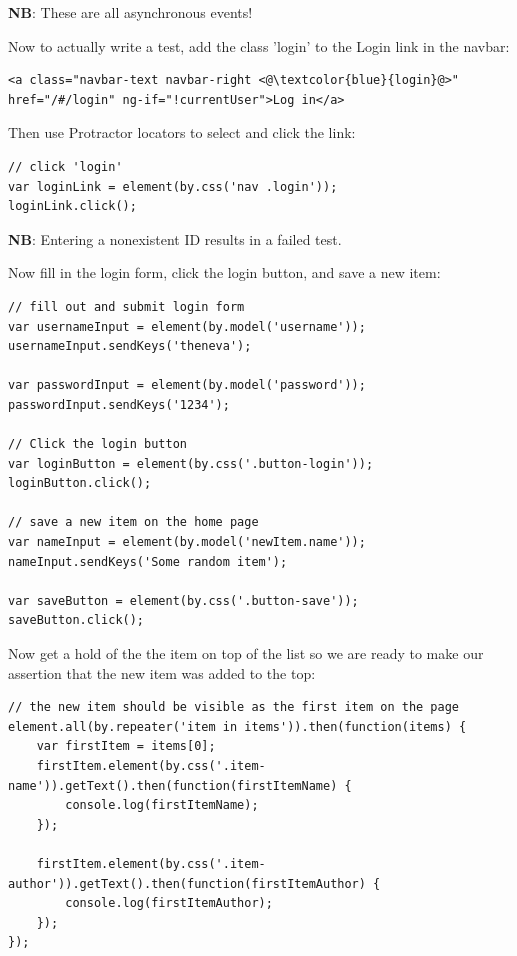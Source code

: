 \documentclass[british]{article}
\begin{document}
\textbf{NB}: These are all asynchronous events!

Now to actually write a test, add the class 'login' to the Login link in the navbar:

\begin{lstlisting}
<a class="navbar-text navbar-right <@\textcolor{blue}{login}@>" href="/#/login" ng-if="!currentUser">Log in</a>
\end{lstlisting}

Then use Protractor locators to select and click the link:

\begin{lstlisting}
// click 'login'
var loginLink = element(by.css('nav .login'));
loginLink.click();    
\end{lstlisting}

\textbf{NB}: Entering a nonexistent ID results in a failed test.

Now fill in the login form, click the login button, and save a new item:

\begin{lstlisting}
// fill out and submit login form
var usernameInput = element(by.model('username'));
usernameInput.sendKeys('theneva');

var passwordInput = element(by.model('password'));
passwordInput.sendKeys('1234');

// Click the login button
var loginButton = element(by.css('.button-login'));
loginButton.click();

// save a new item on the home page
var nameInput = element(by.model('newItem.name'));
nameInput.sendKeys('Some random item');

var saveButton = element(by.css('.button-save'));
saveButton.click();
\end{lstlisting}

Now get a hold of the the item on top of the list so we are ready to make our assertion that the new item was added to the top:

\begin{lstlisting}
// the new item should be visible as the first item on the page
element.all(by.repeater('item in items')).then(function(items) {
	var firstItem = items[0];
	firstItem.element(by.css('.item-name')).getText().then(function(firstItemName) {
		console.log(firstItemName);
	});

	firstItem.element(by.css('.item-author')).getText().then(function(firstItemAuthor) {
		console.log(firstItemAuthor);
	});
});
\end{lstlisting}
\end{document}
